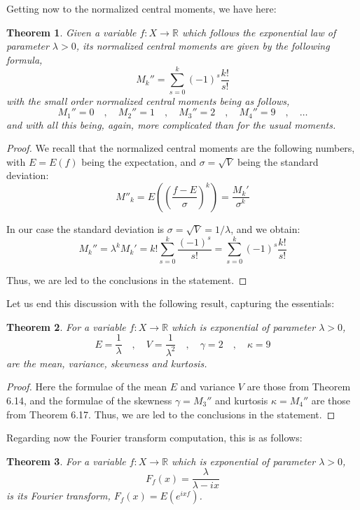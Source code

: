 \documentclass[12pt]{amsbook}
\newtheorem{theorem}{Theorem}[chapter]
\begin{document}
Getting now to the normalized central moments, we have here:

\begin{theorem}
Given a variable $f:X\to\mathbb R$ which follows the exponential law of parameter $\lambda>0$, its normalized central moments are given by the following formula,
$$M_k''=\sum_{s=0}^k(-1)^s\frac{k!}{s!}$$
with the small order normalized central moments being as follows,
$$M_1''=0\quad,\quad 
M_2''=1\quad,\quad
M_3''=2\quad,\quad
M_4''=9\quad,\quad\ldots$$
and with all this being, again, more complicated than for the usual moments.
\end{theorem}

\begin{proof}
We recall that the normalized central moments are the following numbers, with $E=E(f)$ being the expectation, and $\sigma=\sqrt{V}$ being the standard deviation:
$$M''_k=E\left(\left(\frac{f-E}{\sigma}\right)^k\right)=\frac{M_k'}{\sigma^k}$$

In our case the standard deviation is $\sigma=\sqrt{V}=1/\lambda$, and we obtain:
$$M_k''=\lambda^kM_k'=k!\sum_{s=0}^k\frac{(-1)^s}{s!}=\sum_{s=0}^k(-1)^s\frac{k!}{s!}$$

Thus, we are led to the conclusions in the statement. 
\end{proof}

Let us end this discussion with the following result, capturing the essentials:

\begin{theorem}
For a variable $f:X\to\mathbb R$ which is exponential of parameter $\lambda>0$,
$$E=\frac{1}{\lambda}\quad,\quad V=\frac{1}{\lambda^2}\quad,\quad\gamma=2\quad,\quad\kappa=9$$
are the mean, variance, skewness and kurtosis. 
\end{theorem}

\begin{proof}
Here the formulae of the mean $E$ and variance $V$ are those from Theorem 6.14, and the formulae of the skewness $\gamma=M_3''$ and kurtosis $\kappa=M_4''$ are those from Theorem 6.17. Thus, we are led to the conclusions in the statement.
\end{proof}

Regarding now the Fourier transform computation, this is as follows:

\begin{theorem}
For a variable $f:X\to\mathbb R$ which is exponential of parameter $\lambda>0$,
$$F_f(x)=\frac{\lambda}{\lambda-ix}$$
is its Fourier transform, $F_f(x)=E(e^{ixf})$. 
\end{theorem}
\end{document}
